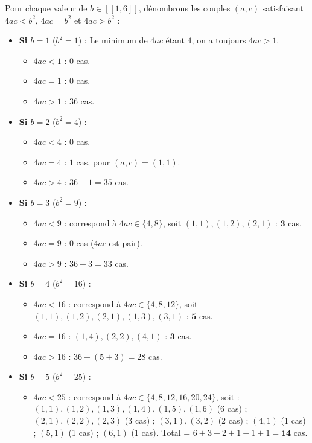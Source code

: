 \documentclass[11pt,a4paper]{article}
\begin{document}
\begin{correctionbox}
Pour chaque valeur de $b \in [\![1, 6]\!]$, dénombrons les couples $(a, c)$ satisfaisant $4ac < b^2$, $4ac = b^2$ et $4ac > b^2$ :
\begin{itemize}[label=$\bullet$]
    \item \textbf{Si $b = 1$} ($b^2 = 1$) : Le minimum de $4ac$ étant $4$, on a toujours $4ac > 1$.
    \begin{itemize}
        \item $4ac < 1$ : $0$ cas.
        \item $4ac = 1$ : $0$ cas.
        \item $4ac > 1$ : $36$ cas.
    \end{itemize}
    \item \textbf{Si $b = 2$} ($b^2 = 4$) :
    \begin{itemize}
        \item $4ac < 4$ : $0$ cas.
        \item $4ac = 4$ : $1$ cas, pour $(a, c) = (1, 1)$.
        \item $4ac > 4$ : $36 - 1 = 35$ cas.
    \end{itemize}
    \item \textbf{Si $b = 3$} ($b^2 = 9$) :
    \begin{itemize}
        \item $4ac < 9$ : correspond à $4ac \in \{4, 8\}$, soit $(1, 1), (1, 2), (2, 1)$ : $\mathbf{3}$ cas.
        \item $4ac = 9$ : $0$ cas ($4ac$ est pair).
        \item $4ac > 9$ : $36 - 3 = 33$ cas.
    \end{itemize}
    \item \textbf{Si $b = 4$} ($b^2 = 16$) :
    \begin{itemize}
        \item $4ac < 16$ : correspond à $4ac \in \{4, 8, 12\}$, soit $(1, 1), (1, 2), (2, 1), (1, 3), (3, 1)$ : $\mathbf{5}$ cas.
        \item $4ac = 16$ : $(1, 4), (2, 2), (4, 1)$ : $\mathbf{3}$ cas.
        \item $4ac > 16$ : $36 - (5 + 3) = 28$ cas.
    \end{itemize}
    \item \textbf{Si $b = 5$} ($b^2 = 25$) :
    \begin{itemize}
        \item $4ac < 25$ : correspond à $4ac \in \{4, 8, 12, 16, 20, 24\}$, soit :
        $(1, 1), (1, 2), (1, 3), (1, 4), (1, 5), (1, 6)$ (6 cas) ; $(2, 1), (2, 2), (2, 3)$ (3 cas) ; $(3, 1), (3, 2)$ (2 cas) ; $(4, 1)$ (1 cas) ; $(5, 1)$ (1 cas) ; $(6, 1)$ (1 cas). Total = $6 + 3 + 2 + 1 + 1 + 1 = \mathbf{14}$ cas.

\end{itemize}
\end{itemize}
\end{correctionbox}
\end{document}
